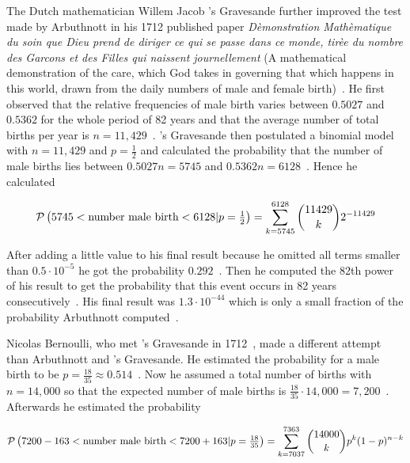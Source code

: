 
The Dutch mathematician Willem Jacob 's Gravesande further improved the test made by Arbuthnott in his 1712 published paper \emph{Dèmonstration Mathèmatique du soin que Dieu prend de diriger ce qui se passe dans ce monde, tirèe du nombre des Garcons et des Filles qui naissent journellement} (A mathematical demonstration of the care, which God takes in governing that which happens in this world, drawn from the daily numbers of male and female birth)~\cite[p. 279]{hald1}. He first observed that the relative frequencies of male birth varies between $0.5027$ and $0.5362$ for the whole period of 82 years and that the average number of total births per year is $n=11,429$~\cite[p. 279]{hald1}. 's Gravesande then postulated a binomial model with $n=11,429$ and $p=\tfrac 12$ and calculated the probability that the number of male births lies between $0.5027n=5745$ and $0.5362n=6128$~\cite[p. 280]{hald1}. Hence he calculated

\begin{align}
    \P{5745 < \text{number male birth} < 6128|p=\tfrac 12} = \sum_{k=5745}^{6128} \binom{11429} k 2^{-11429}
\end{align}

After adding a little value to his final result because he omitted all terms smaller than $0.5\cdot 10^{-5}$ he got the probability $0.292$~\cite[p. 280]{hald1}. Then he computed the 82th power of his result to get the probability that this event occurs in 82 years consecutively~\cite[p. 280]{hald1}. His final result was $1.3\cdot10^{-44}$ which is only a small fraction of the probability Arbuthnott computed~\cite[p. 280]{hald1}.

Nicolas Bernoulli, who met 's Gravesande in 1712~\cite[p. 279]{hald1}, made a different attempt than Arbuthnott and 's Gravesande. He estimated the probability for a male birth to be $p=\tfrac{18}{35}\approx0.514$~\cite[p. 282]{hald1}. Now he assumed a total number of births with $n=14,000$ so that the expected number of male births is $\tfrac{18}{35}\cdot 14,000=7,200$~\cite[p. 282]{hald1}. Afterwards he estimated the probability

\begin{align}
    \P{7200-163 < \text{number male birth} < 7200+163|p=\tfrac{18}{35}} = \sum_{k=7037}^{7363} \binom {14000}{k} p^k (1-p)^{n-k}
\end{align}

